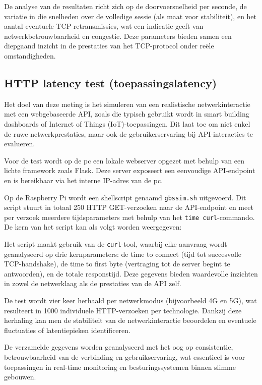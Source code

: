De analyse van de resultaten richt zich op de doorvoersnelheid per seconde, de variatie in die snelheden over de volledige sessie (als maat voor stabiliteit), en het aantal eventuele TCP-retransmissies, wat een indicatie geeft van netwerkbetrouwbaarheid en congestie. Deze parameters bieden samen een diepgaand inzicht in de prestaties van het TCP-protocol onder reële omstandigheden.


\subsection{HTTP latency test (toepassingslatency)}
Het doel van deze meting is het simuleren van een realistische netwerkinteractie met een webgebaseerde API, zoals die typisch gebruikt wordt in smart building dashboards of Internet of Things (IoT)-toepassingen. Dit laat toe om niet enkel de ruwe netwerkprestaties, maar ook de gebruikerservaring bij API-interacties te evalueren.

Voor de test wordt op de pc een lokale webserver opgezet met behulp van een lichte framework zoals Flask. Deze server exposeert een eenvoudige API-endpoint en is bereikbaar via het interne IP-adres van de pc. 

Op de Raspberry Pi wordt een shellscript genaamd \texttt{gbssim.sh} uitgevoerd. Dit script stuurt in totaal 250 HTTP GET-verzoeken naar de API-endpoint en meet per verzoek meerdere tijdsparameters met behulp van het \texttt{time curl}-commando. De kern van het script kan als volgt worden weergegeven:

%    

Het script maakt gebruik van de \texttt{curl}-tool, waarbij elke aanvraag wordt geanalyseerd op drie kernparameters: de time to connect (tijd tot succesvolle TCP-handshake), de time to first byte (vertraging tot de server begint te antwoorden), en de totale responstijd. Deze gegevens bieden waardevolle inzichten in zowel de netwerklaag als de prestaties van de API zelf.

De test wordt vier keer herhaald per netwerkmodus (bijvoorbeeld 4G en 5G), wat resulteert in 1000 individuele HTTP-verzoeken per technologie. Dankzij deze herhaling kan men de stabiliteit van de netwerkinteractie beoordelen en eventuele fluctuaties of latentiepieken identificeren.

De verzamelde gegevens worden geanalyseerd met het oog op consistentie, betrouwbaarheid van de verbinding en gebruikservaring, wat essentieel is voor toepassingen in real-time monitoring en besturingssystemen binnen slimme gebouwen.


